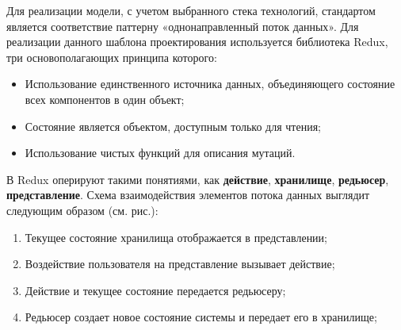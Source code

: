 Для реализации модели, с учетом выбранного стека технологий, стандартом является соответствие паттерну «однонаправленный поток данных». Для реализации данного шаблона проектирования используется библиотека Redux, три основополагающих принципа которого:

\begin{itemize}
	\item Использование единственного источника данных, объединяющего состояние всех компонентов в один объект;
	\item Состояние является объектом, доступным только для чтения;
	\item Использование чистых функций для описания мутаций.
\end{itemize}

В Redux оперируют такими понятиями, как \textbf{действие}, \textbf{хранилище}, \textbf{редьюсер}, \textbf{представление}. Схема взаимодействия элементов потока данных выглядит следующим образом (см. рис.):

\begin{enumerate}
	\item Текущее состояние хранилища отображается в представлении;
	\item Воздействие пользователя на представление вызывает действие;
	\item Действие и текущее состояние передается редьюсеру;
	\item Редьюсер создает новое состояние системы и передает его в хранилище;
\end{enumerate}
